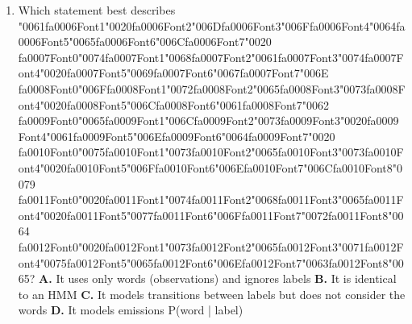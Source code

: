 \documentclass[11pt]{article}
\begin{document}
\begin{enumerate}[leftmargin=*]
  \item Which statement best describes {\char"0061}{\csname fa0006Font1\endcsname\char"0020}{\csname fa0006Font2\endcsname\char"006D}{\csname fa0006Font3\endcsname\char"006F}{\csname fa0006Font4\endcsname\char"0064}{\csname fa0006Font5\endcsname\char"0065}{\csname fa0006Font6\endcsname\char"006C}{\csname fa0006Font7\endcsname\char"0020} {\csname fa0007Font0\endcsname\char"0074}{\csname fa0007Font1\endcsname\char"0068}{\csname fa0007Font2\endcsname\char"0061}{\csname fa0007Font3\endcsname\char"0074}{\csname fa0007Font4\endcsname\char"0020}{\csname fa0007Font5\endcsname\char"0069}{\csname fa0007Font6\endcsname\char"0067}{\csname fa0007Font7\endcsname\char"006E} {\csname fa0008Font0\endcsname\char"006F}{\csname fa0008Font1\endcsname\char"0072}{\csname fa0008Font2\endcsname\char"0065}{\csname fa0008Font3\endcsname\char"0073}{\csname fa0008Font4\endcsname\char"0020}{\csname fa0008Font5\endcsname\char"006C}{\csname fa0008Font6\endcsname\char"0061}{\csname fa0008Font7\endcsname\char"0062} {\csname fa0009Font0\endcsname\char"0065}{\csname fa0009Font1\endcsname\char"006C}{\csname fa0009Font2\endcsname\char"0073}{\csname fa0009Font3\endcsname\char"0020}{\csname fa0009Font4\endcsname\char"0061}{\csname fa0009Font5\endcsname\char"006E}{\csname fa0009Font6\endcsname\char"0064}{\csname fa0009Font7\endcsname\char"0020} {\csname fa0010Font0\endcsname\char"0075}{\csname fa0010Font1\endcsname\char"0073}{\csname fa0010Font2\endcsname\char"0065}{\csname fa0010Font3\endcsname\char"0073}{\csname fa0010Font4\endcsname\char"0020}{\csname fa0010Font5\endcsname\char"006F}{\csname fa0010Font6\endcsname\char"006E}{\csname fa0010Font7\endcsname\char"006C}{\csname fa0010Font8\endcsname\char"0079} {\csname fa0011Font0\endcsname\char"0020}{\csname fa0011Font1\endcsname\char"0074}{\csname fa0011Font2\endcsname\char"0068}{\csname fa0011Font3\endcsname\char"0065}{\csname fa0011Font4\endcsname\char"0020}{\csname fa0011Font5\endcsname\char"0077}{\csname fa0011Font6\endcsname\char"006F}{\csname fa0011Font7\endcsname\char"0072}{\csname fa0011Font8\endcsname\char"0064} {\csname fa0012Font0\endcsname\char"0020}{\csname fa0012Font1\endcsname\char"0073}{\csname fa0012Font2\endcsname\char"0065}{\csname fa0012Font3\endcsname\char"0071}{\csname fa0012Font4\endcsname\char"0075}{\csname fa0012Font5\endcsname\char"0065}{\csname fa0012Font6\endcsname\char"006E}{\csname fa0012Font7\endcsname\char"0063}{\csname fa0012Font8\endcsname\char"0065}?
    \textbf{A.} It uses only words (observations) and ignores labels
    \textbf{B.} It is identical to an HMM
    \textbf{C.} It models transitions between labels but does not consider the words
    \textbf{D.} It models emissions P(word | label)


\end{enumerate}
\end{document}
